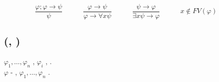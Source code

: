 \[
\frac{\varphi;\varphi\rightarrow\psi}{\psi}\hspace{1em}\hspace{1em}\hspace{1em}\frac{\varphi\rightarrow\psi}{\varphi\rightarrow\forall x\psi}\hspace{1em}\hspace{1em}\hspace{1em}\frac{\psi\rightarrow\varphi}{\exists x\psi\rightarrow\varphi}\hspace{1em}\hspace{1em}\hspace{1em}x\notin FV(\varphi)
\]


\subsection{\textcyr{\CYRO\cyrp\cyrr\cyre\cyrd\cyre\cyrl\cyre\cyrn\cyri\cyre}
(\textcyr{\CYRD\cyro\cyrk\cyra\cyrz\cyra\cyrt\cyre\cyrl\cyrsftsn\cyrs\cyrt\cyrv\cyro},
\textcyr{\cyrd\cyro\cyrk\cyra\cyrz\cyru\cyre\cyrm\cyra\cyrya} \textcyr{\cyrf\cyro\cyrr\cyrm\cyru\cyrl\cyra})}

\textcyr{\CYRP\cyro\cyrs\cyrl\cyre\cyrd\cyro\cyrv\cyra\cyrt\cyre\cyrl\cyrsftsn\cyrn\cyro\cyrs\cyrt\cyrsftsn}
$\varphi_{1},\dots,\varphi_{n}$ \textcyr{\cyrn\cyra\cyrz\cyrery\cyrv\cyra\cyre\cyrt\cyrs\cyrya}
\textbf{\textcyr{\cyrd\cyro\cyrk\cyra\cyrz\cyra\cyrt\cyre\cyrl\cyrsftsn\cyrs\cyrt\cyrv\cyro\cyrm}},
\textcyr{\cyre\cyrs\cyrl\cyri} \textcyr{\cyrk\cyra\cyrzh\cyrd\cyra\cyrya}
$\varphi_{i}$ \textcyr{\cyrya\cyrv\cyrl\cyrya\cyre\cyrt\cyrs\cyrya}
\textcyr{\cyra\cyrk\cyrs\cyri\cyro\cyrm\cyro\cyrishrt}, \textcyr{\cyrl\cyri\cyrb\cyro}
\textcyr{\cyrp\cyro\cyrl\cyru\cyrch\cyre\cyrn\cyra} \textcyr{\cyri\cyrz}
\textcyr{\cyrp\cyrr\cyre\cyrd\cyrery\cyrd\cyru\cyrshch\cyri\cyrh}
\textcyr{\cyro\cyrd\cyrn\cyro\cyrk\cyrr\cyra\cyrt\cyrn\cyrery\cyrm}
\textcyr{\cyrp\cyrr\cyri\cyrm\cyre\cyrn\cyre\cyrn\cyri\cyre\cyrm}
\textcyr{\cyrp\cyrr\cyra\cyrv\cyri\cyrl} \textcyr{\cyrv\cyrery\cyrv\cyro\cyrd\cyra}.
\\
$\varphi$ - \textbf{\textcyr{\cyrd\cyro\cyrk\cyra\cyrz\cyru\cyre\cyrm\cyra}},
\textcyr{\cyre\cyrs\cyrl\cyri} \textcyr{\cyrs\cyru\cyrshch\cyre\cyrs\cyrt\cyrv\cyru\cyre\cyrt}
\textcyr{\cyrd\cyro\cyrk\cyra\cyrz\cyra\cyrt\cyre\cyrl\cyrsftsn\cyrs\cyrt\cyrv\cyro}
$\varphi_{1},\dots,\varphi_{n}$ \textcyr{\cyrz\cyra\cyrk\cyra\cyrn\cyrch\cyri\cyrv\cyra\cyryu\cyrshch\cyre\cyre\cyrs\cyrya}
\textcyr{\cyrerev\cyrt\cyro\cyrishrt} \textcyr{\cyrf\cyro\cyrr\cyrm\cyru\cyrl\cyro\cyrishrt}.

